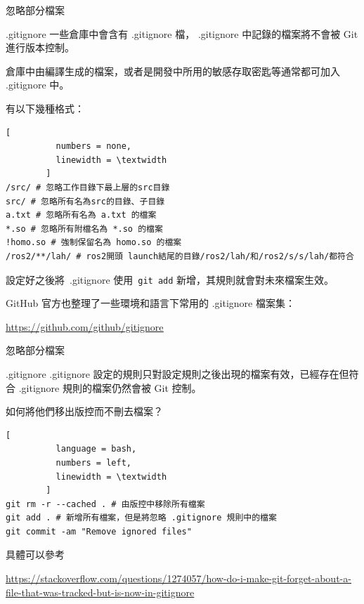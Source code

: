 \documentclass[xetex, unicode, 10pt, aspectratio=169]{beamer}
\begin{document}
\begin{frame}[fragile]{忽略部分檔案}
    \begin{block}{.gitignore}
        一些倉庫中會含有 .gitignore 檔， .gitignore 中記錄的檔案將不會被 Git 進行版本控制。

        倉庫中由編譯生成的檔案，或者是開發中所用的敏感存取密匙等通常都可加入 .gitignore 中。

        有以下幾種格式：

        \begin{lstlisting}[
          numbers = none,
          linewidth = \textwidth
        ]
/src/ # 忽略工作目錄下最上層的src目錄
src/ # 忽略所有名為src的目錄、子目錄
a.txt # 忽略所有名為 a.txt 的檔案
*.so # 忽略所有附檔名為 *.so 的檔案
!homo.so # 強制保留名為 homo.so 的檔案
/ros2/**/lah/ # ros2開頭 launch結尾的目錄/ros2/lah/和/ros2/s/s/lah/都符合\end{lstlisting}

        設定好之後將\ .gitignore 使用\ \texttt{git add} 新增，其規則就會對未來檔案生效。

        GitHub 官方也整理了一些環境和語言下常用的 .gitignore 檔案集：

        \underline{\href{https://github.com/github/gitignore}{https://github.com/github/gitignore}}
    \end{block}
\end{frame}

\begin{frame}[fragile]{忽略部分檔案}
    \begin{block}{.gitignore}
        .gitignore 設定的規則只對設定規則之後出現的檔案有效，已經存在但符合 .gitignore 規則的檔案仍然會被 Git 控制。

        如何將他們移出版控而不刪去檔案？
        \pause
        \begin{lstlisting}[
          language = bash,
          numbers = left,
          linewidth = \textwidth
        ]
git rm -r --cached . # 由版控中移除所有檔案
git add . # 新增所有檔案，但是將忽略 .gitignore 規則中的檔案
git commit -am "Remove ignored files"\end{lstlisting}

        具體可以參考

        \underline{\href{https://stackoverflow.com/questions/1274057/how-do-i-make-git-forget-about-a-file-that-was-tracked-but-is-now-in-gitignore}{\scriptsize
        https://stackoverflow.com/questions/1274057/how-do-i-make-git-forget-about-a-file-that-was-tracked-but-is-now-in-gitignore}}
    \end{block}

\end{frame}
\end{document}
